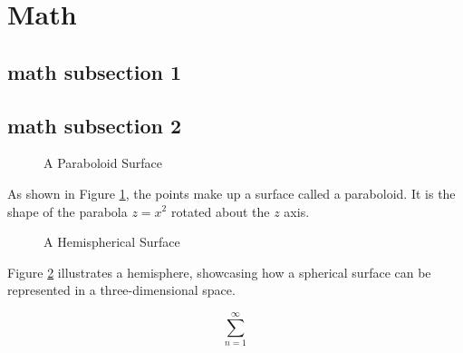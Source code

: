\section{Math}

\subsection{math subsection 1}
\lipsum[1]

\subsection{math subsection 2}
\begin{figure}[htbp]
\centering
{}
\caption{A Paraboloid Surface}
\label{fig:paraboloid}
\end{figure}

As shown in Figure \ref{fig:paraboloid}, the points make up a surface called a paraboloid. It is the shape of the parabola \( z = x^2 \) rotated about the \( z \) axis.

\begin{figure}[h]
\centering
{}
\caption{A Hemispherical Surface}
\label{fig:hemisphere}
\end{figure}

Figure \ref{fig:hemisphere} illustrates a hemisphere, showcasing how a spherical surface can be represented in a three-dimensional space.

$$ \sum_{n = 1}^{\infty}$$